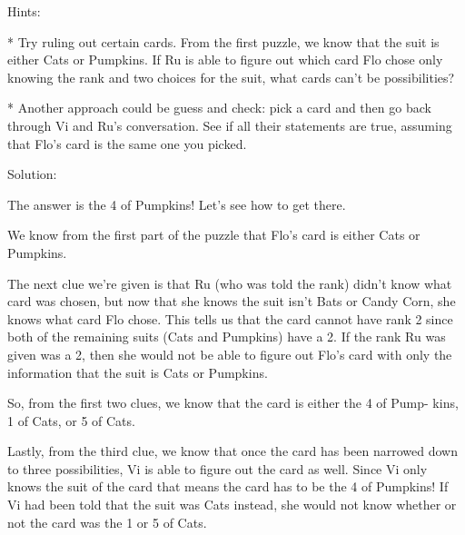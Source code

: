 


Hints:

* Try ruling out certain cards. From the first puzzle, we know that the
suit is either Cats or Pumpkins. If Ru is able to figure out which card
Flo chose only knowing the rank and two choices for the suit, what cards
can’t be possibilities?

* Another approach could be guess and check: pick a card and then go back
through Vi and Ru’s conversation. See if all their statements are true,
assuming that Flo’s card is the same one you picked.


Solution:

The answer is the 4 of Pumpkins! Let’s see how to get there.

We know from the first part of the puzzle that Flo’s card is either Cats or
Pumpkins.

The next clue we’re given is that Ru (who was told the rank) didn’t know
what card was chosen, but now that she knows the suit isn’t Bats or Candy
Corn, she knows what card Flo chose. This tells us that the card cannot have
rank 2 since both of the remaining suits (Cats and Pumpkins) have a 2. If the
rank Ru was given was a 2, then she would not be able to figure out Flo’s card
with only the information that the suit is Cats or Pumpkins.

So, from the first two clues, we know that the card is either the 4 of Pump-
kins, 1 of Cats, or 5 of Cats.

Lastly, from the third clue, we know that once the card has been narrowed
down to three possibilities, Vi is able to figure out the card as well. Since Vi
only knows the suit of the card that means the card has to be the 4 of Pumpkins!
If Vi had been told that the suit was Cats instead, she would not know whether
or not the card was the 1 or 5 of Cats.
